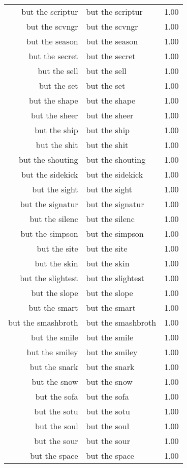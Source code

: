 \begin{table}[ht]
\begin{tabular}{rlr}
  but the scriptur & but the scriptur & 1.00 \\ 
  but the scvngr & but the scvngr & 1.00 \\ 
  but the season & but the season & 1.00 \\ 
  but the secret & but the secret & 1.00 \\ 
  but the sell & but the sell & 1.00 \\ 
  but the set & but the set & 1.00 \\ 
  but the shape & but the shape & 1.00 \\ 
  but the sheer & but the sheer & 1.00 \\ 
  but the ship & but the ship & 1.00 \\ 
  but the shit & but the shit & 1.00 \\ 
  but the shouting & but the shouting & 1.00 \\ 
  but the sidekick & but the sidekick & 1.00 \\ 
  but the sight & but the sight & 1.00 \\ 
  but the signatur & but the signatur & 1.00 \\ 
  but the silenc & but the silenc & 1.00 \\ 
  but the simpson & but the simpson & 1.00 \\ 
  but the site & but the site & 1.00 \\ 
  but the skin & but the skin & 1.00 \\ 
  but the slightest & but the slightest & 1.00 \\ 
  but the slope & but the slope & 1.00 \\ 
  but the smart & but the smart & 1.00 \\ 
  but the smashbroth & but the smashbroth & 1.00 \\ 
  but the smile & but the smile & 1.00 \\ 
  but the smiley & but the smiley & 1.00 \\ 
  but the snark & but the snark & 1.00 \\ 
  but the snow & but the snow & 1.00 \\ 
  but the sofa & but the sofa & 1.00 \\ 
  but the sotu & but the sotu & 1.00 \\ 
  but the soul & but the soul & 1.00 \\ 
  but the sour & but the sour & 1.00 \\ 
  but the space & but the space & 1.00 \\ 

\end{tabular}
\end{table}
